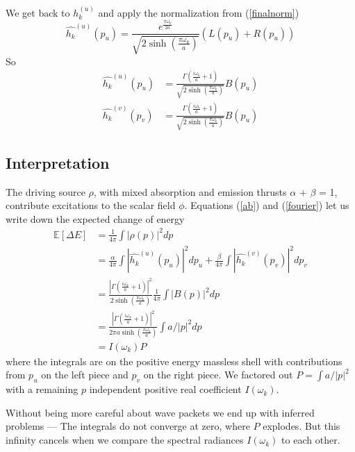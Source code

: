 \documentclass[12pt,a4paper]{article}
\begin{document}
We get back to $h_k^{(u)}$ and apply the normalization from (\ref{finalnorm})
\[
\hat{h_k}^{(u)}(p_u) = \frac{e^{\frac{\pi \omega_k}{2a}}}{\sqrt{2 \sinh \left({\frac{\pi\omega_k}{a}}\right)}}  ( L(p_u) + R(p_u) )
\]
So
\begin{equation}
\label{fourier}
\begin{split}
\hat{h_k}^{(u)}(p_u) & = \frac{\Gamma\left(\frac{i\omega_k}{a} + 1\right)}{\sqrt{2 \sinh \left({\frac{\pi\omega_k}{a}}\right)}} B(p_u)\\
\hat{h_k}^{(v)}(p_v) &= \frac{\Gamma\left(\frac{i\omega_k}{a} + 1\right)}{\sqrt{2 \sinh \left({\frac{\pi\omega_k}{a}}\right)}} B(p_u)
\end{split}
\end{equation}
\subsection{Interpretation}
The driving source $\rho$, with mixed absorption and emission thrusts $\alpha$ + $\beta$ = 1, contribute excitations to the scalar field $\phi$. Equations (\ref{ab}) and (\ref{fourier}) let us write down the expected change of energy
\begin{equation}  
  \label{number}
  \begin{split}
    \mathbb{E}[\Delta E] &= \frac{1}{4\pi} \int{|\rho(p)|^2 dp} \\
    &= \frac{\alpha}{4\pi} \int{\left|\hat{h_k}^{(u)}(p_u)\right|^2 dp_u} + \frac{\beta}{4\pi}\int{\left|\hat{h_k}^{(v)}(p_v)\right|^2dp_v} \\
    &= \frac{\left|\Gamma\left(\frac{i\omega_k}{a} + 1\right)\right|^2}{2 \sinh \left({\frac{\pi\omega_k}{a}}\right)} \frac{1}{4\pi} \int{{\left|B(p)\right|^2} dp} \\
    &=  \frac{\left|\Gamma\left(\frac{i\omega_k}{a} + 1\right)\right|^2}{2 \pi a \sinh \left({\frac{\pi\omega_k}{a}}\right)} \int{a/|p|^2 dp}\\  
&=I(\omega_k) P
  \end{split}
\end{equation}
where the integrals are on the positive energy massless shell with contributions from $p_u$ on the left piece and $p_v$ on the right piece.  We factored out $P = \int{a/|p|^2}$ with a remaining $p$ independent positive real coefficient $I(\omega_k)$.

Without being more careful about wave packets we end up with inferred problems --- The integrals do not converge at zero, where $P$ explodes.  But this infinity cancels when we compare the spectral radiances $I(\omega_k)$ to each other.
\end{document}
